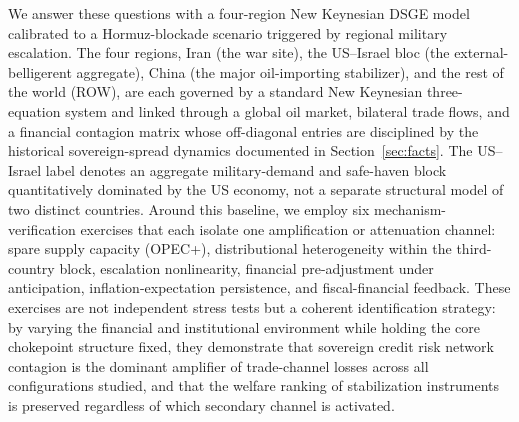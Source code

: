 \documentclass[12pt]{article}
\begin{document}
We answer these questions with a four-region New Keynesian DSGE model calibrated to a Hormuz-blockade scenario triggered by regional military escalation. The four regions, Iran (the war site), the US--Israel bloc (the external-belligerent aggregate), China (the major oil-importing stabilizer), and the rest of the world (ROW), are each governed by a standard New Keynesian three-equation system and linked through a global oil market, bilateral trade flows, and a financial contagion matrix whose off-diagonal entries are disciplined by the historical sovereign-spread dynamics documented in Section~\ref{sec:facts}. The US--Israel label denotes an aggregate military-demand and safe-haven block quantitatively dominated by the US economy, not a separate structural model of two distinct countries. Around this baseline, we employ six mechanism-verification exercises that each isolate one amplification or attenuation channel: spare supply capacity (OPEC+), distributional heterogeneity within the third-country block, escalation nonlinearity, financial pre-adjustment under anticipation, inflation-expectation persistence, and fiscal-financial feedback. These exercises are not independent stress tests but a coherent identification strategy: by varying the financial and institutional environment while holding the core chokepoint structure fixed, they demonstrate that sovereign credit risk network contagion is the dominant amplifier of trade-channel losses across all configurations studied, and that the welfare ranking of stabilization instruments is preserved regardless of which secondary channel is activated.
\end{document}
